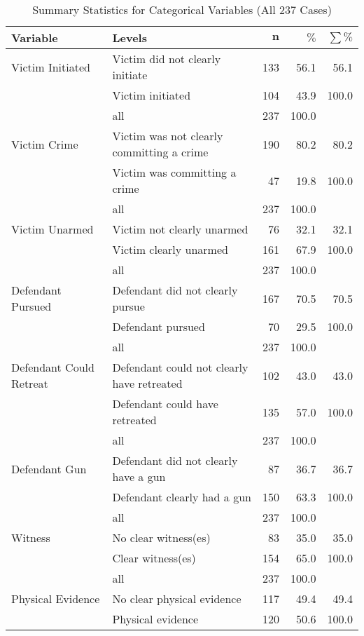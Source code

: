 \documentclass[11pt, oneside]{article}   	%
\begin{document}
{\footnotesize
\begin{longtable}{ll|rrr}
\caption{Summary Statistics for Categorical Variables (All 237 Cases)} \\ 
 \textbf{Variable} & \textbf{Levels} & $\mathbf{n}$ & $\mathbf{\%}$ & $\mathbf{\sum \%}$ \\ 
  \hline
Victim Initiated & Victim did not clearly initiate & 133 & 56.1 & 56.1 \\ 
   & Victim initiated & 104 & 43.9 & 100.0 \\ 
   \hline
 & all & 237 & 100.0 &  \\ 
   \hline
\hline
Victim Crime  & Victim was not clearly committing a crime & 190 & 80.2 & 80.2 \\ 
   & Victim was committing a crime & 47 & 19.8 & 100.0 \\ 
   \hline
 & all & 237 & 100.0 &  \\ 
   \hline
\hline
Victim Unarmed & Victim not clearly unarmed & 76 & 32.1 & 32.1 \\ 
   & Victim clearly unarmed & 161 & 67.9 & 100.0 \\ 
   \hline
 & all & 237 & 100.0 &  \\ 
   \hline
\hline
Defendant Pursued & Defendant did not clearly pursue & 167 & 70.5 & 70.5 \\ 
   & Defendant pursued & 70 & 29.5 & 100.0 \\ 
   \hline
 & all & 237 & 100.0 &  \\ 
   \hline
\hline
Defendant Could Retreat & Defendant could not clearly have retreated & 102 & 43.0 & 43.0 \\ 
   & Defendant could have retreated & 135 & 57.0 & 100.0 \\ 
   \hline
 & all & 237 & 100.0 &  \\ 
   \hline
\hline
Defendant Gun & Defendant did not clearly have a gun & 87 & 36.7 & 36.7 \\ 
   & Defendant clearly had a gun & 150 & 63.3 & 100.0 \\ 
   \hline
 & all & 237 & 100.0 &  \\ 
   \hline
\hline
Witness & No clear witness(es) & 83 & 35.0 & 35.0 \\ 
   & Clear witness(es) & 154 & 65.0 & 100.0 \\ 
   \hline
 & all & 237 & 100.0 &  \\ 
   \hline
\hline
Physical Evidence & No clear physical evidence & 117 & 49.4 & 49.4 \\ 
   & Physical evidence & 120 & 50.6 & 100.0 \\ 

\end{longtable}}
\end{document}
